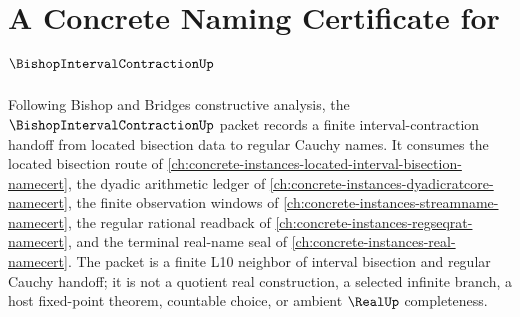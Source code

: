 \chapter{A Concrete Naming Certificate for $\BishopIntervalContractionUp$}
\label{ch:concrete-instances-bishop-interval-contraction-namecert}

Following Bishop and Bridges constructive analysis, the $\BishopIntervalContractionUp$ packet records a finite interval-contraction handoff from located bisection data to regular Cauchy names. It consumes the located bisection route of \autoref{ch:concrete-instances-located-interval-bisection-namecert}, the dyadic arithmetic ledger of \autoref{ch:concrete-instances-dyadicratcore-namecert}, the finite observation windows of \autoref{ch:concrete-instances-streamname-namecert}, the regular rational readback of \autoref{ch:concrete-instances-regseqrat-namecert}, and the terminal real-name seal of \autoref{ch:concrete-instances-real-namecert}. The packet is a finite L10 neighbor of interval bisection and regular Cauchy handoff; it is not a quotient real construction, a selected infinite branch, a host fixed-point theorem, countable choice, or ambient $\RealUp$ completeness.

